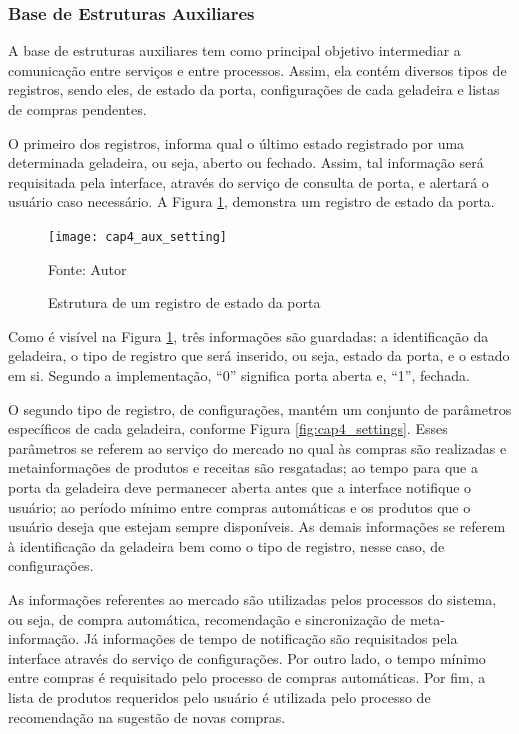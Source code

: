 \subsubsection{Base de Estruturas Auxiliares}  \label{sssec:base_est-aux}

A base de estruturas auxiliares tem como principal objetivo intermediar a comunicação entre serviços e entre processos. Assim, ela contém diversos tipos de registros, sendo eles, de estado da porta, configurações de cada geladeira e listas de compras pendentes.

O primeiro dos registros, informa qual o último estado registrado por uma determinada geladeira, ou seja, aberto ou fechado. Assim, tal informação será requisitada pela interface, através do serviço de consulta de porta, e alertará o usuário caso necessário. A Figura \ref{fig:cap4_aux_setting}, demonstra um registro de estado da porta.

\begin{figure}[htb]
    \caption{Estrutura de um registro de estado da porta}
    \label{fig:cap4_aux_setting}
    \texttt{[image: cap4\_aux\_setting]}
    
    Fonte: Autor
\end{figure}

Como é visível na Figura \ref{fig:cap4_aux_setting}, três informações são guardadas: a identificação da geladeira, o tipo de registro que será inserido, ou seja, estado da porta, e o estado em si. Segundo a implementação, ``0'' significa porta aberta e, ``1'', fechada.

O segundo tipo de registro, de configurações, mantém um conjunto de parâmetros específicos de cada geladeira, conforme Figura \ref{fig:cap4_settings}. Esses parâmetros se referem ao serviço do mercado no qual às compras são realizadas e metainformações de produtos e receitas são resgatadas; ao tempo para que a porta da geladeira deve permanecer aberta antes que a interface notifique o usuário; ao período mínimo entre compras automáticas e os produtos que o usuário deseja que estejam sempre disponíveis. As demais informações se referem à identificação da geladeira bem como o tipo de registro, nesse caso, de configurações.

As informações referentes ao mercado são utilizadas pelos processos do sistema, ou seja, de compra automática, recomendação e sincronização de meta-informação. Já informações de tempo de notificação são requisitados pela interface através do serviço de configurações. Por outro lado, o tempo mínimo entre compras é requisitado pelo processo de compras automáticas. Por fim, a lista de produtos requeridos pelo usuário é utilizada pelo processo de recomendação na sugestão de novas compras.

